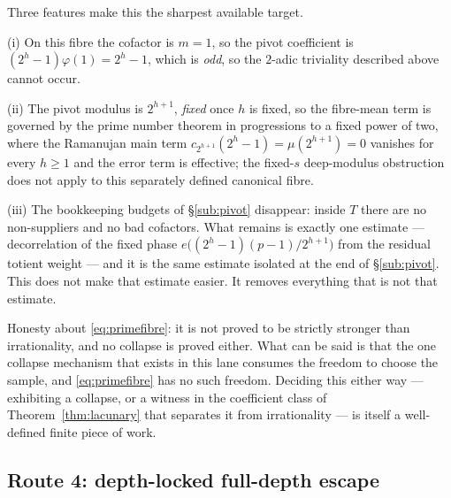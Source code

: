 Three features make this the sharpest available target.

(i) On this fibre the
cofactor is $m=1$, so the pivot coefficient is $(2^{h}-1)\varphi(1)=2^{h}-1$,
which is \emph{odd}, so the $2$-adic triviality described above cannot occur.

(ii) The pivot modulus is
$2^{h+1}$, \emph{fixed} once $h$ is fixed, so the fibre-mean term is governed
by the prime number theorem in progressions to a fixed power of two, where
the Ramanujan main term $c_{2^{h+1}}(2^{h}-1)=\mu(2^{h+1})=0$ vanishes for
every $h\ge1$ and the error term is effective; the fixed-$s$ deep-modulus
obstruction does not apply to this separately defined canonical fibre.

(iii) The bookkeeping budgets of \S\ref{sub:pivot} disappear:
inside $T$ there are no non-suppliers and no bad cofactors. What remains is
exactly one estimate --- decorrelation of the fixed phase
$e\bigl((2^{h}-1)(p-1)/2^{h+1}\bigr)$ from the residual totient weight --- and
it is the same estimate isolated at the end of \S\ref{sub:pivot}. This does
not make that estimate easier. It removes everything that is not that
estimate.

\begin{rem}
Honesty about \eqref{eq:primefibre}: it is not proved to be strictly stronger
than irrationality, and no collapse is proved either. What can be said is
that the one collapse mechanism that exists in this lane consumes the freedom
to choose the sample, and \eqref{eq:primefibre} has no such freedom. Deciding
this either way --- exhibiting a collapse, or a witness in the coefficient
class of Theorem~\ref{thm:lacunary} that separates it from irrationality ---
is itself a well-defined finite piece of work.
\end{rem}

\subsection{Route 4: depth-locked full-depth escape}

